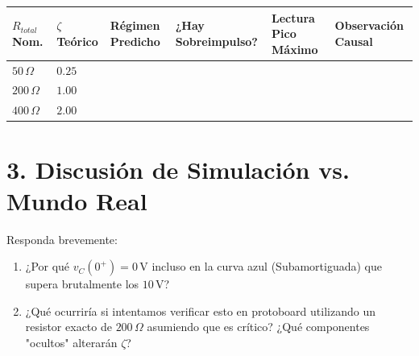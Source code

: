 \documentclass[11pt, a4paper]{article}
\begin{document}
\renewcommand{\arraystretch}{1.5}
\noindent
\begin{tabularx}{\textwidth}{
  >{\centering\arraybackslash\hsize=0.8\hsize}X 
  >{\centering\arraybackslash\hsize=0.8\hsize}X 
  >{\RaggedRight\arraybackslash\hsize=1.2\hsize}X 
  >{\centering\arraybackslash\hsize=0.8\hsize}X 
  >{\centering\arraybackslash\hsize=0.8\hsize}X 
  >{\RaggedRight\arraybackslash\hsize=1.6\hsize}X}
\toprule
\textbf{$R_{total}$ Nom.} & \textbf{$\zeta$ Teórico} & \textbf{Régimen Predicho} & \textbf{¿Hay Sobreimpulso?} & \textbf{Lectura Pico Máximo} & \textbf{Observación Causal} \\ 
\midrule
$50\,\Omega$ & $0.25$ & & & & \\ \addlinespace
$200\,\Omega$ & $1.00$ & & & & \\ \addlinespace
$400\,\Omega$ & $2.00$ & & & & \\
\bottomrule
\end{tabularx}

\section*{3. Discusión de Simulación vs. Mundo Real}
Responda brevemente:
\begin{enumerate}
    \item ¿Por qué $v_C(0^+) = 0\,\text{V}$ incluso en la curva azul (Subamortiguada) que supera brutalmente los $10\,\text{V}$? \par
    \vspace{0.2cm}
    \noindent\hrulefill
    
    \item ¿Qué ocurriría si intentamos verificar esto en protoboard utilizando un resistor exacto de $200\,\Omega$ asumiendo que es crítico? ¿Qué componentes "ocultos" alterarán $\zeta$? \par
    \vspace{0.2cm}
    \noindent\hrulefill
\end{enumerate}
\end{document}
